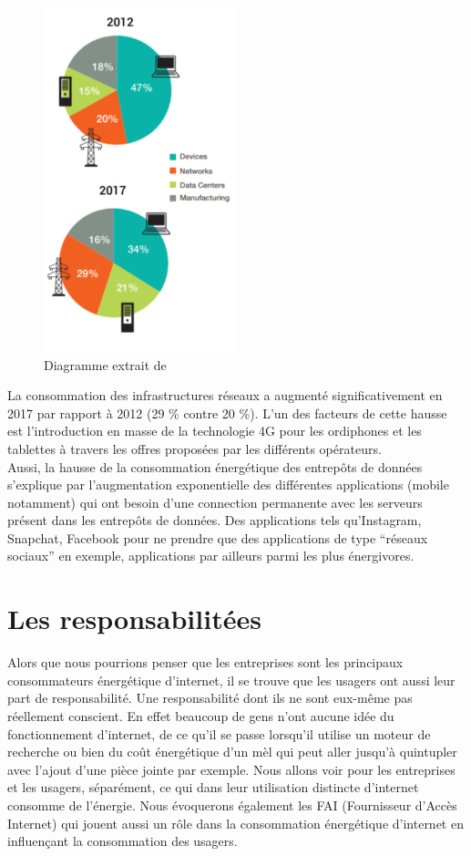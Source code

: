 \documentclass[a4paper,twocolumn,12pt]{article}
\begin{document}
\begin{figure}[!h]	
\centerline{\includegraphics[height=10cm]{picture/diagCamenbert.png}}
\caption{Diagramme extrait de \cite{23}}
\label{diagCamenbert}
\end{figure}	

	\newpage

	La consommation des infrastructures réseaux a augmenté significativement  en 2017 par rapport à 2012 (29 \% contre 20 \%). L’un des facteurs de cette hausse est l’introduction en masse de la technologie 4G pour les ordiphones et les tablettes à travers les offres proposées par les différents opérateurs. \\

	Aussi, la hausse de la consommation énergétique des entrepôts de données s’explique par l’augmentation exponentielle des différentes applications (mobile notamment) qui ont besoin d’une connection permanente avec les serveurs présent dans les entrepôts de données. Des applications tels qu'Instagram, Snapchat, Facebook pour ne prendre que des applications de type “réseaux sociaux” en exemple, applications par ailleurs parmi les plus énergivores.
	
\section{Les responsabilitées}

	Alors que nous pourrions penser que les entreprises sont les principaux consommateurs énergétique d’internet, il se trouve que les usagers ont aussi leur part de responsabilité. Une responsabilité dont ils ne sont eux-même pas réellement conscient. En effet beaucoup de gens n’ont aucune idée du fonctionnement d’internet, de ce qu’il se passe lorsqu’il utilise un moteur de recherche ou bien du coût énergétique d’un mèl qui peut aller jusqu’à quintupler avec l’ajout d’une pièce jointe par exemple. Nous allons voir pour les entreprises et les usagers, séparément, ce qui dans leur utilisation distincte d’internet consomme de l’énergie. Nous évoquerons également les FAI (Fournisseur d'Accès Internet) qui jouent aussi un rôle dans la consommation énergétique d’internet en influençant la consommation des usagers.  
	
\end{document}
